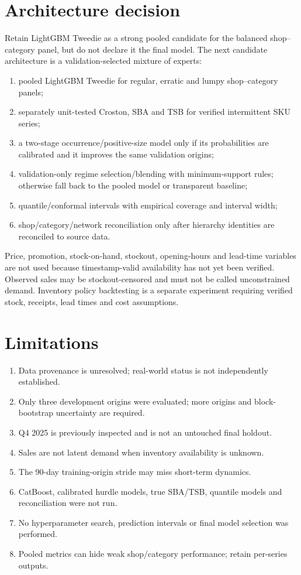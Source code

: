 \documentclass[11pt,a4paper]{article}
\begin{document}
\section{Architecture decision}
Retain LightGBM Tweedie as a strong pooled candidate for the balanced shop--category panel, but do not declare it the final model. The next candidate architecture is a validation-selected mixture of experts:
\begin{enumerate}
\item pooled LightGBM Tweedie for regular, erratic and lumpy shop--category panels;
\item separately unit-tested Croston, SBA and TSB for verified intermittent SKU series;
\item a two-stage occurrence/positive-size model only if its probabilities are calibrated and it improves the same validation origins;
\item validation-only regime selection/blending with minimum-support rules; otherwise fall back to the pooled model or transparent baseline;
\item quantile/conformal intervals with empirical coverage and interval width;
\item shop/category/network reconciliation only after hierarchy identities are reconciled to source data.
\end{enumerate}
Price, promotion, stock-on-hand, stockout, opening-hours and lead-time variables are not used because timestamp-valid availability has not yet been verified. Observed sales may be stockout-censored and must not be called unconstrained demand. Inventory policy backtesting is a separate experiment requiring verified stock, receipts, lead times and cost assumptions.

\section{Limitations}
\begin{enumerate}
\item Data provenance is unresolved; real-world status is not independently established.
\item Only three development origins were evaluated; more origins and block-bootstrap uncertainty are required.
\item Q4 2025 is previously inspected and is not an untouched final holdout.
\item Sales are not latent demand when inventory availability is unknown.
\item The 90-day training-origin stride may miss short-term dynamics.
\item CatBoost, calibrated hurdle models, true SBA/TSB, quantile models and reconciliation were not run.
\item No hyperparameter search, prediction intervals or final model selection was performed.
\item Pooled metrics can hide weak shop/category performance; retain per-series outputs.
\end{enumerate}
\end{document}
